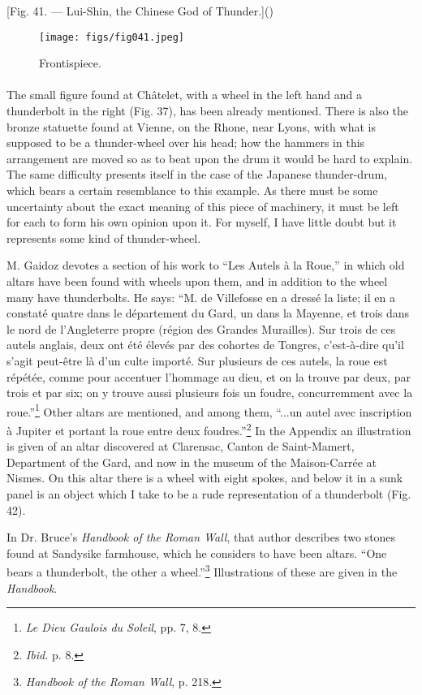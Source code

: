\documentclass[a4paper, 11pt, oneside, polutonikogreek, english]{article}
\begin{document}
[Fig. 41. --- Lui-Shin, the Chinese God of Thunder.]()
\begin{figure}[H]
\centering
\texttt{[image: figs/fig041.jpeg]}
\caption{Frontispiece.}
\end{figure}
\paragraph{}
The small figure found at Châtelet, with a wheel in the left hand and a thunderbolt in the right (Fig. 37), has been already mentioned. There is also the bronze statuette found at Vienne, on the Rhone, near Lyons, with what is supposed to be a thunder-wheel over his head; how the hammers in this arrangement are moved so as to beat upon the drum it would be hard to explain. The same difficulty presents itself in the case of the Japanese thunder-drum, which bears a certain resemblance to this example. As there must be some uncertainty about the exact meaning of this piece of machinery, it must be left for each to form his own opinion upon it. For myself, I have little doubt but it represents some kind of thunder-wheel.

M. Gaidoz devotes a section of his work to ``Les Autels à la Roue,'' in which old altars have been found with wheels upon them, and in addition to the wheel many have thunderbolts. He says: ``M. de Villefosse en a dressé la liste; il en a constaté quatre dans le département du Gard, un dans la Mayenne, et trois dans le nord de l'Angleterre propre (région des Grandes Murailles). Sur trois de ces autels anglais, deux ont été élevés par des cohortes de Tongres, c'est-à-dire qu'il s'agit peut-être là d'un culte importé. Sur plusieurs de ces autels, la roue est répétée, comme pour accentuer l'hommage au dieu, et on la trouve par deux, par trois et par six; on y trouve aussi plusieurs fois un foudre, concurremment avec la roue.''\footnote{\emph{Le Dieu Gaulois du Soleil}, pp. 7, 8.} Other altars are mentioned, and among them, ``...un autel avec inscription à Jupiter et portant la roue entre deux foudres.''\footnote{\emph{Ibid.} p. 8.} In the Appendix an illustration is given of an altar discovered at Clarensac, Canton de Saint-Mamert, Department of the Gard, and now in the museum of the Maison-Carrée at Nismes. On this altar there is a wheel with eight spokes, and below it in a sunk panel is an object which I take to be a rude representation of a thunderbolt (Fig. 42).

In Dr. Bruce's \emph{Handbook of the Roman Wall}, that author describes two stones found at Sandysike farmhouse, which he considers to have been altars. ``One bears a thunderbolt, the other a wheel.''\footnote{\emph{Handbook of the Roman Wall}, p. 218.} Illustrations of these are given in the \emph{Handbook}.
\end{document}
